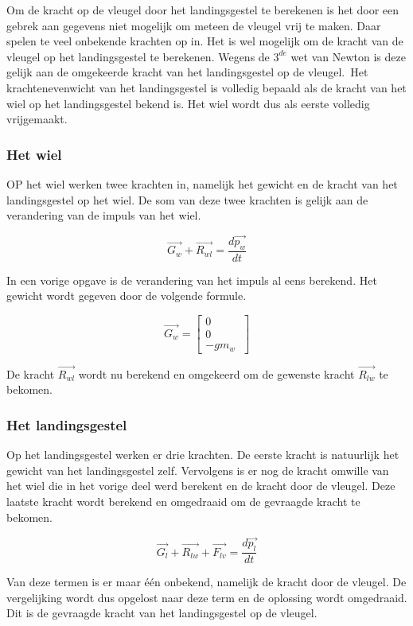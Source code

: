 Om de kracht op de vleugel door het landingsgestel te berekenen is het door een gebrek aan gegevens niet mogelijk om meteen de vleugel vrij te maken. Daar spelen te veel onbekende krachten op in. Het is wel mogelijk om de kracht van de vleugel op het landingsgestel te berekenen. Wegens de $3^{de}$ wet van Newton is deze gelijk aan de omgekeerde kracht van het landingsgestel op de vleugel.\
Het krachtenevenwicht van het landingsgestel is volledig bepaald als de kracht van het wiel op het landingsgestel bekend is. Het wiel wordt dus als eerste volledig vrijgemaakt.

\subsubsection{Het wiel}
OP het wiel werken twee krachten in, namelijk het gewicht en de kracht van het landingsgestel op het wiel. De som van deze twee krachten is gelijk aan de verandering van de impuls van het wiel.

\begin{equation*}
\overrightarrow{G_{w}}+\overrightarrow{R_{wl}}=\frac{d\overrightarrow{p_{w}}}{dt}
\end{equation*}

In een vorige opgave is de verandering van het impuls al eens berekend. Het gewicht wordt gegeven door de volgende formule.

\begin{equation*}
\overrightarrow{G_{w}}
=	\begin{bmatrix}
	0\\
	0\\
	-gm_{w}\
	\end{bmatrix}
\end{equation*}

De kracht $\overrightarrow{R_{wl}}$ wordt nu berekend en omgekeerd om de gewenste kracht $\overrightarrow{R_{lw}}$ te bekomen.


\subsubsection{Het landingsgestel}
Op het landingsgestel werken er drie krachten. De eerste kracht is natuurlijk het gewicht van het landingsgestel zelf. Vervolgens is er nog de kracht omwille van het wiel die in het vorige deel werd berekent en de kracht door de vleugel. Deze laatste kracht wordt berekend en omgedraaid om de gevraagde kracht te bekomen.

\begin{equation*}
\overrightarrow{G_{l}}+\overrightarrow{R_{lw}}+\overrightarrow{F_{lv}}=\frac{d\overrightarrow{p_{l}}}{dt}
\end{equation*}

Van deze termen is er maar \'e\'en onbekend, namelijk de kracht door de vleugel. De vergelijking wordt dus opgelost naar deze term en de oplossing wordt omgedraaid. Dit is de gevraagde kracht van het landingsgestel op de vleugel.